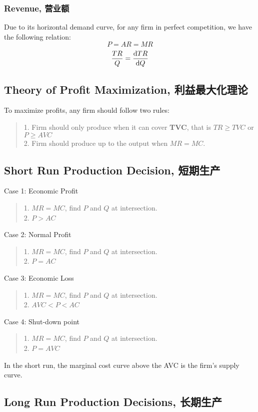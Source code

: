 \subsubsection{Revenue, 营业额}
Due to its horizontal demand curve, for any firm in perfect competition, we have the following relation:
$$P = AR = MR$$
$$\frac{TR}{Q} = \dv{TR}{Q}$$

\subsection{Theory of Profit Maximization, 利益最大化理论}
To maximize profits, any firm should follow two rules:
\begin{quote}
    1. Firm should only produce when it can cover \textbf{TVC}, that is $TR \ge TVC$ or $P \ge AVC$ \\
    2. Firm should produce up to the output when $MR = MC$.
\end{quote}

\subsection{Short Run Production Decision, 短期生产}
Case 1: Economic Profit
\begin{quote}
    1. $MR = MC$, find $P$ and $Q$ at intersection. \\
    2. $P > AC$
\end{quote}
Case 2: Normal Profit
\begin{quote}
    1. $MR = MC$, find $P$ and $Q$ at intersection. \\
    2. $P = AC$
\end{quote}
Case 3: Economic Loss
\begin{quote}
    1. $MR = MC$, find $P$ and $Q$ at intersection. \\
    2. $AVC < P < AC$
\end{quote}
Case 4: Shut-down point
\begin{quote}
    1. $MR = MC$, find $P$ and $Q$ at intersection. \\
    2. $P = AVC$
\end{quote}
In the short run, the marginal cost curve above the AVC is the firm's supply curve. \\

\subsection{Long Run Production Decisions, 长期生产}
